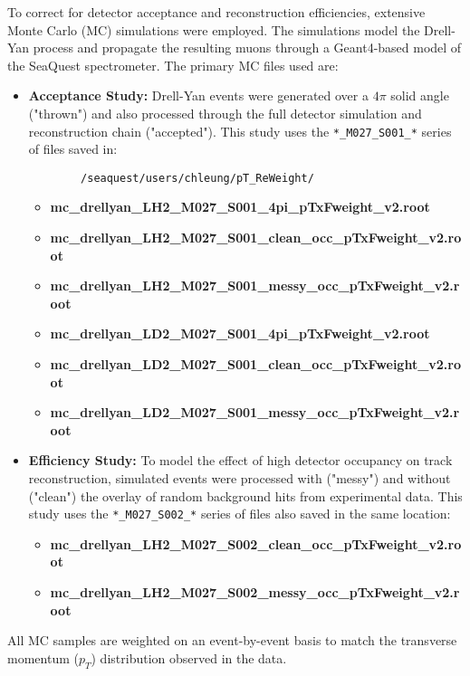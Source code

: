 \documentclass[11pt]{article}
\begin{document}
To correct for detector acceptance and reconstruction efficiencies, extensive Monte Carlo (MC) simulations were employed. The simulations model the Drell-Yan process and propagate the resulting muons through a Geant4-based model of the SeaQuest spectrometer. The primary MC files used are:
\begin{itemize}
    \item \textbf{Acceptance Study:} Drell-Yan events were generated over a $4\pi$ solid angle ("thrown") and also processed through the full detector simulation and reconstruction chain ("accepted"). This study uses the \texttt{*\_M027\_S001\_*} series of files saved in: \begin{verbatim}
        /seaquest/users/chleung/pT_ReWeight/
    \end{verbatim}
    \begin{itemize}
        \item \textbf{mc\_drellyan\_LH2\_M027\_S001\_4pi\_pTxFweight\_v2.root}
	    \item \textbf{mc\_drellyan\_LH2\_M027\_S001\_clean\_occ\_pTxFweight\_v2.root}
	    \item \textbf{mc\_drellyan\_LH2\_M027\_S001\_messy\_occ\_pTxFweight\_v2.root}
        \item \textbf{mc\_drellyan\_LD2\_M027\_S001\_4pi\_pTxFweight\_v2.root}
        \item \textbf{mc\_drellyan\_LD2\_M027\_S001\_clean\_occ\_pTxFweight\_v2.root}
        \item \textbf{mc\_drellyan\_LD2\_M027\_S001\_messy\_occ\_pTxFweight\_v2.root}
    \end{itemize}
    \item \textbf{Efficiency Study:} To model the effect of high detector occupancy on track reconstruction, simulated events were processed with ("messy") and without ("clean") the overlay of random background hits from experimental data. This study uses the \texttt{*\_M027\_S002\_*} series of files also saved in the same location:
    \begin{itemize}
        \item \textbf{mc\_drellyan\_LH2\_M027\_S002\_clean\_occ\_pTxFweight\_v2.root}
        \item \textbf{mc\_drellyan\_LH2\_M027\_S002\_messy\_occ\_pTxFweight\_v2.root}    
    \end{itemize}
\end{itemize}
All MC samples are weighted on an event-by-event basis to match the transverse momentum ($p_T$) distribution observed in the data.
\end{document}
